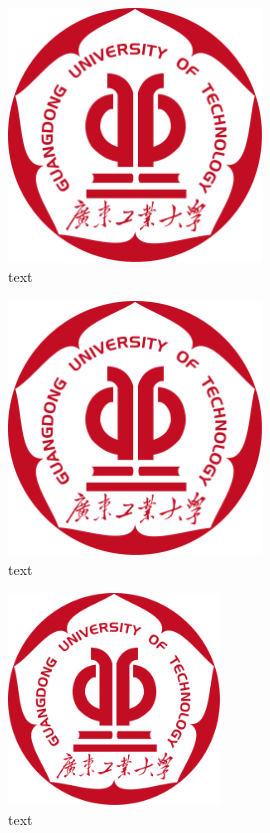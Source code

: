 \begin{figure}[h]
    \centering
    \includegraphics[width=0.6\textwidth]{figures/logo.pdf}
    \caption{text}
\end{figure}

\begin{figure}[h]
    \centering
    \includegraphics[width=0.6\textwidth]{figures/logo.pdf}
    \caption{text}
\end{figure}

\begin{figure}[h]
    \centering
    \includegraphics[width=0.5\textwidth]{figures/logo.pdf}
    \caption{text}
\end{figure}

